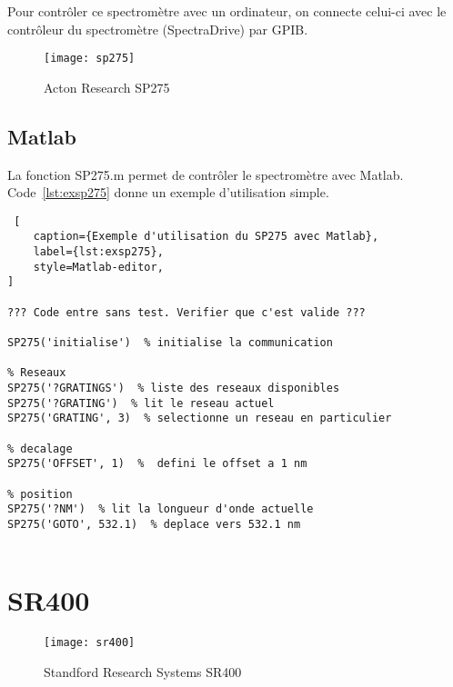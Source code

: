 \documentclass[11pt,francais]{book} %
\begin{document}
Pour contrôler ce spectromètre avec un ordinateur, on connecte celui-ci avec le contrôleur du spectromètre (SpectraDrive) par GPIB.

\begin{figure}[htbp]
\centering\texttt{[image: sp275]}
\caption{Acton Research SP275}
\label{fig:sp275}
\end{figure}

\subsection{Matlab}

La fonction SP275.m permet de contrôler le spectromètre avec Matlab.
Code~\ref{lst:exsp275} donne un exemple d'utilisation simple.

\begin{lstlisting} [
    caption={Exemple d'utilisation du SP275 avec Matlab},
    label={lst:exsp275},
    style=Matlab-editor,
]

??? Code entre sans test. Verifier que c'est valide ???
  
SP275('initialise')  % initialise la communication

% Reseaux
SP275('?GRATINGS')  % liste des reseaux disponibles
SP275('?GRATING')  % lit le reseau actuel
SP275('GRATING', 3)  % selectionne un reseau en particulier

% decalage
SP275('OFFSET', 1)  %  defini le offset a 1 nm

% position
SP275('?NM')  % lit la longueur d'onde actuelle
SP275('GOTO', 532.1)  % deplace vers 532.1 nm
  
\end{lstlisting}



\section{SR400}

\begin{figure}[htbp]
\centering\texttt{[image: sr400]}
\caption{Standford Research Systems SR400}
\label{fig:sr400}
\end{figure}
\end{document}
